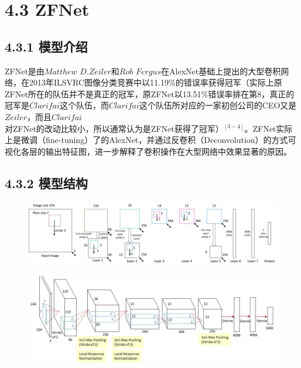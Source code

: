 \section{4.3 ZFNet}\label{zfnet}

\subsection{4.3.1 模型介绍}\label{ux6a21ux578bux4ecbux7ecd-2}

​ ZFNet是由\(Matthew\) \(D. Zeiler\)和\(Rob\)
\(Fergus\)在AlexNet基础上提出的大型卷积网络，在2013年ILSVRC图像分类竞赛中以11.19\%的错误率获得冠军（实际上原ZFNet所在的队伍并不是真正的冠军，原ZFNet以13.51\%错误率排在第8，真正的冠军是\(Clarifai\)这个队伍，而\(Clarifai\)这个队伍所对应的一家初创公司的CEO又是\(Zeiler\)，而且\(Clarifai\)对ZFNet的改动比较小，所以通常认为是ZFNet获得了冠军）\(^{[3-4]}​\)。ZFNet实际上是微调（fine-tuning）了的AlexNet，并通过反卷积（Deconvolution）的方式可视化各层的输出特征图，进一步解释了卷积操作在大型网络中效果显著的原因。

\subsection{4.3.2 模型结构}\label{ux6a21ux578bux7ed3ux6784-2}

\begin{figure}
\centering
\includegraphics{./img/ch4/image21.png}
\caption{}
\end{figure}

\begin{figure}
\centering
\includegraphics{./img/ch4/image21.jpeg}
\caption{}
\end{figure}

